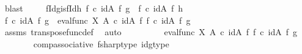 \begin{isabellebody}
\ blast\isanewline
\isanewline
\ \ \ \isamarkupfalse%
\ fIdg{\isacharunderscore}{\kern0pt}is{\isacharunderscore}{\kern0pt}fIdh{\isacharcolon}{\kern0pt}\ {\isachardoublequoteopen}f\ {\isasymcirc}\isactrlsub c\ {\isacharparenleft}{\kern0pt}id{\isacharparenleft}{\kern0pt}A{\isacharparenright}{\kern0pt}\ {\isasymtimes}\isactrlsub f\ g{\isacharparenright}{\kern0pt}\ {\isacharequal}{\kern0pt}\ f\ {\isasymcirc}\isactrlsub c\ {\isacharparenleft}{\kern0pt}id{\isacharparenleft}{\kern0pt}A{\isacharparenright}{\kern0pt}\ {\isasymtimes}\isactrlsub f\ h{\isacharparenright}{\kern0pt}{\isachardoublequoteclose}\isanewline
\ \ \ \isamarkupfalse%
\ {\isacharminus}{\kern0pt}\ \isanewline
\ \ \ \ \isamarkupfalse%
\ {\isachardoublequoteopen}f\ {\isasymcirc}\isactrlsub c\ {\isacharparenleft}{\kern0pt}id{\isacharparenleft}{\kern0pt}A{\isacharparenright}{\kern0pt}\ {\isasymtimes}\isactrlsub f\ g{\isacharparenright}{\kern0pt}\ {\isacharequal}{\kern0pt}\ {\isacharparenleft}{\kern0pt}eval{\isacharunderscore}{\kern0pt}func\ X\ A\ {\isasymcirc}\isactrlsub c\ {\isacharparenleft}{\kern0pt}id{\isacharparenleft}{\kern0pt}A{\isacharparenright}{\kern0pt}\ {\isasymtimes}\isactrlsub f\ f\isactrlsup {\isasymsharp}{\isacharparenright}{\kern0pt}{\isacharparenright}{\kern0pt}\ {\isasymcirc}\isactrlsub c\ {\isacharparenleft}{\kern0pt}id{\isacharparenleft}{\kern0pt}A{\isacharparenright}{\kern0pt}\ {\isasymtimes}\isactrlsub f\ g{\isacharparenright}{\kern0pt}{\isachardoublequoteclose}\isanewline
\ \ \ \ \ \ \isamarkupfalse%
\ assms{\isacharparenleft}{\kern0pt}{}{\isacharparenright}{\kern0pt}\ transpose{\isacharunderscore}{\kern0pt}func{\isacharunderscore}{\kern0pt}def\ \isamarkupfalse%
\ auto\isanewline
\ \ \ \ \isamarkupfalse%
\ \isamarkupfalse%
\ {\isachardoublequoteopen}{\isachardot}{\kern0pt}{\isachardot}{\kern0pt}{\isachardot}{\kern0pt}\ {\isacharequal}{\kern0pt}\ eval{\isacharunderscore}{\kern0pt}func\ X\ A\ {\isasymcirc}\isactrlsub c\ {\isacharparenleft}{\kern0pt}{\isacharparenleft}{\kern0pt}id{\isacharparenleft}{\kern0pt}A{\isacharparenright}{\kern0pt}\ {\isasymtimes}\isactrlsub f\ f\isactrlsup {\isasymsharp}{\isacharparenright}{\kern0pt}\ {\isasymcirc}\isactrlsub c\ {\isacharparenleft}{\kern0pt}id{\isacharparenleft}{\kern0pt}A{\isacharparenright}{\kern0pt}\ {\isasymtimes}\isactrlsub f\ g{\isacharparenright}{\kern0pt}{\isacharparenright}{\kern0pt}{\isachardoublequoteclose}\isanewline
\ \ \ \ \ \ \isamarkupfalse%
\ comp{\isacharunderscore}{\kern0pt}associative{}\ f{\isacharunderscore}{\kern0pt}sharp{\isacharunderscore}{\kern0pt}type{}\ idg{\isacharunderscore}{\kern0pt}type\ \isamarkupfalse%

\end{isabellebody}
